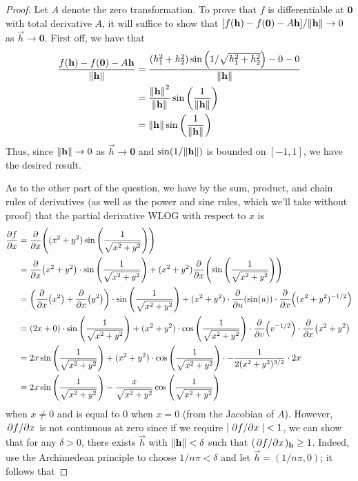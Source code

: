 \documentclass[../psets.tex]{subfiles}
\begin{document}
\begin{enumerate}
\begin{enumerate}
\begin{proof}
            Let $A$ denote the zero transformation. To prove that $f$ is differentiable at $\bm{0}$ with total derivative $A$, it will suffice to show that $[f(\mathbf{h})-f(\bm{0})-A\mathbf{h}]/\norm{\mathbf{h}}\to 0$ as $\vec{h}\to\bm{0}$. First off, we have that
            \begin{align*}
                \frac{f(\mathbf{h})-f(\bm{0})-A\mathbf{h}}{\norm{\mathbf{h}}} &= \frac{(h_1^2+h_2^2)\sin\left( 1/\sqrt{h_1^2+h_2^2} \right)-0-0}{\norm{\mathbf{h}}}\\
                &= \frac{\norm{\mathbf{h}}^2}{\norm{\mathbf{h}}}\sin\left( \frac{1}{\norm{\mathbf{h}}} \right)\\
                &= \norm{\mathbf{h}}\sin\left( \frac{1}{\norm{\mathbf{h}}} \right)
            \end{align*}
            Thus, since $\norm{\mathbf{h}}\to 0$ as $\vec{h}\to\bm{0}$ and $\sin(1/\norm{\mathbf{h}})$ is bounded on $[-1,1]$, we have the desired result.\par
            As to the other part of the question, we have by the sum, product, and chain rules of derivatives (as well as the power and sine rules, which we'll take without proof) that the partial derivative WLOG with respect to $x$ is
            \begin{align*}
                \pdv{f}{x} &= \pdv{x}((x^2+y^2)\sin\left( \frac{1}{\sqrt{x^2+y^2}} \right))\\
                &= \pdv{x}(x^2+y^2)\cdot\sin\left( \frac{1}{\sqrt{x^2+y^2}} \right)+(x^2+y^2)\pdv{x}(\sin\left( \frac{1}{\sqrt{x^2+y^2}} \right))\\
                &= \left( \pdv{x}(x^2)+\pdv{x}(y^2) \right)\cdot\sin\left( \frac{1}{\sqrt{x^2+y^2}} \right)+(x^2+y^2)\cdot\pdv{u}(\sin(u))\cdot\pdv{x}((x^2+y^2)^{-1/2})\\
                &= (2x+0)\cdot\sin\left( \frac{1}{\sqrt{x^2+y^2}} \right)+(x^2+y^2)\cdot\cos\left( \frac{1}{\sqrt{x^2+y^2}} \right)\cdot\pdv{v}(v^{-1/2})\cdot\pdv{x}(x^2+y^2)\\
                &= 2x\sin\left( \frac{1}{\sqrt{x^2+y^2}} \right)+(x^2+y^2)\cdot\cos\left( \frac{1}{\sqrt{x^2+y^2}} \right)\cdot-\frac{1}{2(x^2+y^2)^{3/2}}\cdot 2x\\
                &= 2x\sin\left( \frac{1}{\sqrt{x^2+y^2}} \right)-\frac{x}{\sqrt{x^2+y^2}}\cos\left( \frac{1}{\sqrt{x^2+y^2}} \right)
            \end{align*}
            when $x\neq 0$ and is equal to 0 when $x=0$ (from the Jacobian of $A$). However, $\pdv*{f}{x}$ is not continuous at zero since if we require $|\pdv*{f}{x}|<1$, we can show that for any $\delta>0$, there exists $\vec{h}$ with $\norm{\mathbf{h}}<\delta$ such that $(\pdv*{f}{x})_\mathbf{h}\geq 1$. Indeed, use the Archimedean principle to choose $1/n\pi<\delta$ and let $\vec{h}=(1/n\pi,0)$; it follows that

\end{proof}
\end{enumerate}
\end{enumerate}
\end{document}
